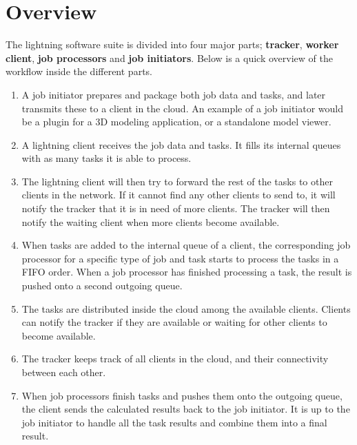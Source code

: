 \chapter{Overview}
The lightning software suite is divided into four major parts; \textbf{tracker}, \textbf{worker client}, \textbf{job processors} and \textbf{job initiators}. Below is a quick overview of the workflow inside the different parts. 

\begin{enumerate}
  \item A job initiator prepares and package both job data and tasks, and later transmits these to a client in the cloud. An example of a job initiator would be a plugin for a 3D modeling application, or a standalone model viewer.
  \item A lightning client receives the job data and tasks. It fills its internal queues with as many tasks it is able to process.
  \item The lightning client will then try to forward the rest of the tasks to other clients in the network. If it cannot find any other clients to send to, it will notify the tracker that it is in need of more clients. The tracker will then notify the waiting client when more clients become available.
  \item When tasks are added to the internal queue of a client, the corresponding job processor for a specific type of job and task  starts to process the tasks in a FIFO order. When a job processor has finished processing a task, the result is pushed onto a second outgoing queue.
  \item The tasks are distributed inside the cloud among the available clients. Clients can notify the tracker if they are available or waiting for other clients to become available.
  \item The tracker keeps track of all clients in the cloud, and their connectivity between each other.
  \item When job processors finish tasks and pushes them onto the outgoing queue, the client sends the calculated results back to the job initiator. It is up to the job initiator to handle all the task results and combine them into a final result.
\end{enumerate}

